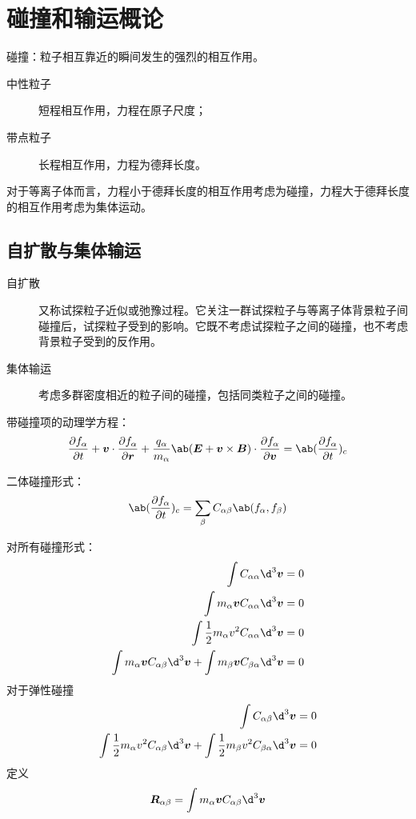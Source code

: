 
\chapter{碰撞和输运概论}

碰撞：粒子相互靠近的瞬间发生的强烈的相互作用。
\begin{description}
    \item[中性粒子] 短程相互作用，力程在原子尺度；
    \item[带点粒子] 长程相互作用，力程为德拜长度。
\end{description}

对于等离子体而言，力程小于德拜长度的相互作用考虑为碰撞，力程大于德拜长度的相互作用考虑为集体运动。

\section{自扩散与集体输运}

\begin{description}
    \item[自扩散] 又称试探粒子近似或弛豫过程。它关注一群试探粒子与等离子体背景粒子间碰撞后，试探粒子受到的影响。它既不考虑试探粒子之间的碰撞，也不考虑背景粒子受到的反作用。
    \item[集体输运] 考虑多群密度相近的粒子间的碰撞，包括同类粒子之间的碰撞。
\end{description}

带碰撞项的动理学方程：
\begin{equation}
\pdv{f_\alpha}{t}
+ \vec{v} \cdot \pdv{f_\alpha}{\vec{r}}
+ \frac{q_\alpha}{m_\alpha} \ab(
    \vec{E} + \vec{v} \times \vec{B}
) \cdot \pdv{f_\alpha}{\vec{v}}
= \ab(\pdv{f_\alpha}{t})_c
\end{equation}

二体碰撞形式：
\begin{equation}
\ab(\pdv{f_\alpha}{t})_c = \sum_\beta C_{\alpha\beta} \ab(f_\alpha, f_\beta)
\end{equation}

对所有碰撞形式：
\begin{subequations}\begin{align}
\int C_{\alpha\alpha} \d^3\vec{v} &= 0 \\
\int m_\alpha\vec{v} C_{\alpha\alpha} \d^3\vec{v} &= 0 \\
\int \frac{1}{2} m_\alpha v^2 C_{\alpha\alpha} \d^3\vec{v} &= 0 \\
\int m_\alpha\vec{v} C_{\alpha\beta} \d^3\vec{v}
+ \int m_\beta\vec{v} C_{\beta\alpha} \d^3\vec{v}&= 0
\end{align}\end{subequations}
对于弹性碰撞
\begin{subequations}\begin{align}
\int C_{\alpha\beta} \d^3\vec{v} &= 0\\
\int \frac{1}{2} m_\alpha v^2 C_{\alpha\beta} \d^3\vec{v}
+ \int \frac{1}{2} m_\beta v^2 C_{\beta\alpha} \d^3\vec{v} &= 0
\end{align}\end{subequations}
定义
\begin{equation}
\vec{R}_{\alpha\beta} = \int m_\alpha\vec{v} C_{\alpha\beta} \d^3\vec{v}
\end{equation}

